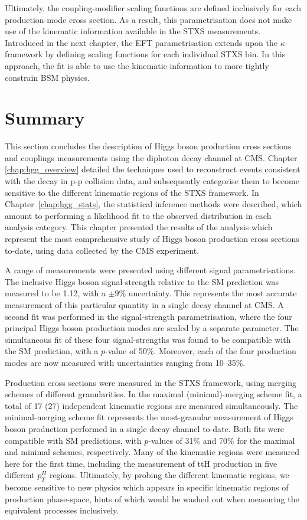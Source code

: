 Ultimately, the coupling-modifier scaling functions are defined inclusively for each production-mode cross section. As a result, this parametrisation does not make use of the kinematic information available in the STXS measurements. Introduced in the next chapter, the EFT parametrisation extends upon the $\kappa$-framework by defining scaling functions for each individual STXS bin. In this approach, the fit is able to use the kinematic information to more tightly constrain BSM physics.


\section{Summary}
This section concludes the description of Higgs boson production cross sections and couplings measurements using the diphoton decay channel at CMS. Chapter \ref{chap:hgg_overview} detailed the techniques used to reconstruct events consistent with the \Hgg decay in p-p collision data, and subsequently categorise them to become sensitive to the different kinematic regions of the STXS framework. In Chapter~\ref{chap:hgg_stats}, the statistical inference methods were described, which amount to performing a likelihood fit to the observed \mgg distribution in each analysis category. This chapter presented the results of the analysis which represent the most comprehensive study of Higgs boson production cross sections to-date, using data collected by the CMS experiment.

A range of measurements were presented using different signal parametrisations. The inclusive Higgs boson signal-strength relative to the SM prediction was measured to be 1.12, with a $\pm 9\%$ uncertainty. This represents the most accurate measurement of this particular quantity in a single decay channel at CMS. A second fit was performed in the signal-strength parametrisation, where the four principal Higgs boson production modes are scaled by a separate parameter. The simultaneous fit of these four signal-strengths was found to be compatible with the SM prediction, with a $p$-value of 50\%. Moreover, each of the four production modes are now measured with uncertainties ranging from 10--35\%.

Production cross sections were measured in the STXS framework, using merging schemes of different granularities. In the maximal (minimal)-merging scheme fit, a total of 17 (27) independent kinematic regions are measured simultaneously. The minimal-merging scheme fit represents the most-granular measurement of Higgs boson production performed in a single decay channel to-date. Both fits were compatible with SM predictions, with $p$-values of 31\% and 70\% for the maximal and minimal schemes, respectively. Many of the kinematic regions were measured here for the first time, including the measurement of ttH production in five different $p_T^H$ regions. Ultimately, by probing the different kinematic regions, we become sensitive to new physics which appears in specific kinematic regions of production phase-space, hints of which would be washed out when measuring the equivalent processes inclusively. 

